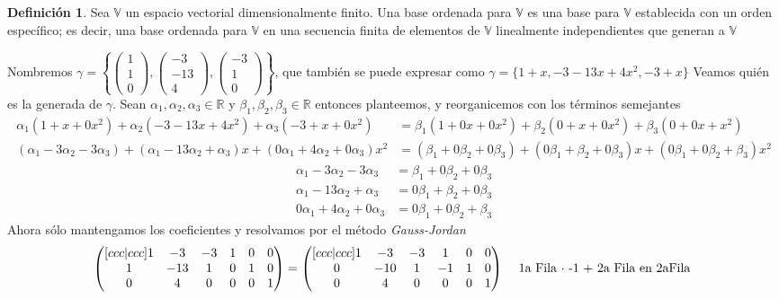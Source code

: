 \documentclass[letterpaper]{article}
\newcommand{\V}{\mathds{V}}
\newcommand{\R}{\mathds{R}}
\renewcommand{\*}{\cdot}
\theoremstyle{definition}
\newtheorem{definition}{Definición}
\begin{document}
\begin{definition}
	Sea $ \V $ un espacio vectorial dimensionalmente finito. Una base ordenada para $ \V $ es una base para $ \V $ establecida con un orden específico; es decir, una base ordenada para $ \V $ en una secuencia finita de elementos de $ \V $ linealmente independientes que generan a $ \V $
\end{definition}
Nombremos $ \gamma = \left\lbrace \begin{pmatrix}
1\\
1\\
0
\end{pmatrix}, \begin{pmatrix}
-3\\
-13\\
4
\end{pmatrix}, \begin{pmatrix}
-3\\
1\\
0
\end{pmatrix} \right\rbrace $,  que también se puede expresar como $ \gamma = \{ 1 +x, -3 -13x +4x^2, -3 + x \} $
Veamos quién es la generada de $ \gamma $. Sean $ \alpha_1, \alpha_2, \alpha_3 \in \R $ y $ \beta_1, \beta_2, \beta_3 \in \R $ entonces planteemos, y reorganicemos con los términos semejantes
\begin{align*}
	\alpha_1(1+x + 0x^2) + \alpha_2(-3-13x+4x^2) + \alpha_3(-3 +x + 0x^2) & = \beta_1(1 + 0x + 0x^2) + \beta_2( 0 + x + 0x^2) + \beta_3(0 + 0x + x^2)\\
	(\alpha_1 - 3\alpha_2 - 3\alpha_3) + (\alpha_1 - 13 \alpha_2 + \alpha_3)x  + (0\alpha_1 + 4\alpha_2 + 0\alpha_3)x^2& = (\beta_1 + 0 \beta_2 + 0\beta_3) + (0\beta_1 + \beta_2 + 0\beta_3)x + (0\beta_1 + 0 \beta_2 + \beta_3)x^2
\end{align*}
\begin{align*}
	\alpha_1 - 3\alpha_2 - 3\alpha_3  & = \beta_1 + 0 \beta_2 + 0\beta_3\\ 
	\alpha_1 - 13 \alpha_2 + \alpha_3 & = 0\beta_1 + \beta_2 + 0\beta_3\\ 
	0\alpha_1 + 4\alpha_2 + 0\alpha_3 & = 0\beta_1 + 0 \beta_2 + \beta_3
\end{align*}
Ahora sólo mantengamos los coeficientes y resolvamos por el método\textit{ Gauss-Jordan}
\begin{align*}
	\begin{pmatrix}[ccc|ccc]
	1 & -3 & -3 & 1 & 0 & 0\\
	1 & -13 & 1 & 0 & 1 & 0\\
	0 & 4 & 0 & 0 & 0 & 1
	\end{pmatrix} & = \begin{pmatrix}[ccc|ccc]
	1 & -3 & -3 & 1 & 0 & 0\\
	0 & -10 & 1 & -1 & 1 & 0\\
	0 & 4 & 0 & 0 & 0 & 1
	\end{pmatrix}&& \text{ 1a Fila $ \* $ -1 + 2a Fila en 2aFila }\\
\end{align*}
\end{document}

